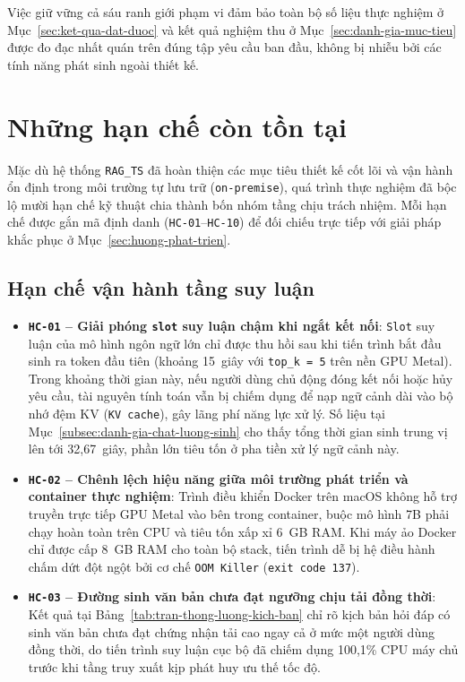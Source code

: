 Việc giữ vững cả sáu ranh giới phạm vi đảm bảo toàn bộ số liệu thực nghiệm ở Mục~\ref{sec:ket-qua-dat-duoc} và kết quả nghiệm thu ở Mục~\ref{sec:danh-gia-muc-tieu} được đo đạc nhất quán trên đúng tập yêu cầu ban đầu, không bị nhiễu bởi các tính năng phát sinh ngoài thiết kế.

\section{Những hạn chế còn tồn tại}
\label{sec:han-che}

Mặc dù hệ thống \texttt{RAG\_TS} đã hoàn thiện các mục tiêu thiết kế cốt lõi và vận hành ổn định trong môi trường tự lưu trữ (\texttt{on-premise}), quá trình thực nghiệm đã bộc lộ mười hạn chế kỹ thuật chia thành bốn nhóm tầng chịu trách nhiệm. Mỗi hạn chế được gắn mã định danh (\texttt{HC-01}--\texttt{HC-10}) để đối chiếu trực tiếp với giải pháp khắc phục ở Mục~\ref{sec:huong-phat-trien}.

\subsection{Hạn chế vận hành tầng suy luận}
\label{subsec:han-che-suy-luan}

\begin{itemize}
\item[--] \textbf{\texttt{HC-01} -- Giải phóng \texttt{slot} suy luận chậm khi ngắt kết nối}: \texttt{Slot} suy luận của mô hình ngôn ngữ lớn chỉ được thu hồi sau khi tiến trình bắt đầu sinh ra token đầu tiên (khoảng 15~giây với \texttt{top\_k = 5} trên nền GPU Metal). Trong khoảng thời gian này, nếu người dùng chủ động đóng kết nối hoặc hủy yêu cầu, tài nguyên tính toán vẫn bị chiếm dụng để nạp ngữ cảnh dài vào bộ nhớ đệm KV (\texttt{KV cache}), gây lãng phí năng lực xử lý. Số liệu tại Mục~\ref{subsec:danh-gia-chat-luong-sinh} cho thấy tổng thời gian sinh trung vị lên tới 32,67~giây, phần lớn tiêu tốn ở pha tiền xử lý ngữ cảnh này.
\item[--] \textbf{\texttt{HC-02} -- Chênh lệch hiệu năng giữa môi trường phát triển và container thực nghiệm}: Trình điều khiển Docker trên macOS không hỗ trợ truyền trực tiếp GPU Metal vào bên trong container, buộc mô hình 7B phải chạy hoàn toàn trên CPU và tiêu tốn xấp xỉ 6~GB RAM. Khi máy ảo Docker chỉ được cấp 8~GB RAM cho toàn bộ stack, tiến trình dễ bị hệ điều hành chấm dứt đột ngột bởi cơ chế \texttt{OOM Killer} (\texttt{exit code 137}).
\item[--] \textbf{\texttt{HC-03} -- Đường sinh văn bản chưa đạt ngưỡng chịu tải đồng thời}: Kết quả tại Bảng~\ref{tab:tran-thong-luong-kich-ban} chỉ rõ kịch bản hỏi đáp có sinh văn bản chưa đạt chứng nhận tải cao ngay cả ở mức một người dùng đồng thời, do tiến trình suy luận cục bộ đã chiếm dụng 100,1\% CPU máy chủ trước khi tầng truy xuất kịp phát huy ưu thế tốc độ.
\end{itemize}

